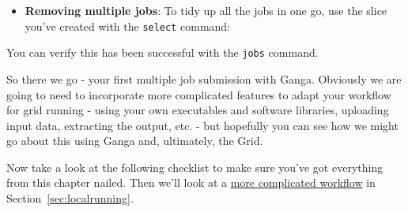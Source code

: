 \begin{itemize}
\tightlist
\item
  \textbf{Removing multiple jobs}: To tidy up all the jobs in one go,
  use the slice you've created with the \texttt{select} command:
\end{itemize}

\begin{Shaded}
\begin{Highlighting}[]
 
     
\NormalTok{[}\NormalTok{]}
     
\end{Highlighting}
\end{Shaded}

You can verify this has been successful with the \texttt{jobs} command.

So there we go - your first multiple job submission with Ganga.
Obviously we are going to need to incorporate more complicated features
to adapt your workflow for grid running - using your own executables and
software libraries, uploading input data, extracting the output, etc. -
but hopefully you can see how we might go about this using Ganga and,
ultimately, the Grid.

Now take a look at the following checklist to make sure
you've got everything from this chapter nailed. Then we'll look at a
\hyperref[sec:localrunning]{more complicated workflow} in
Section~\ref{sec:localrunning}.




